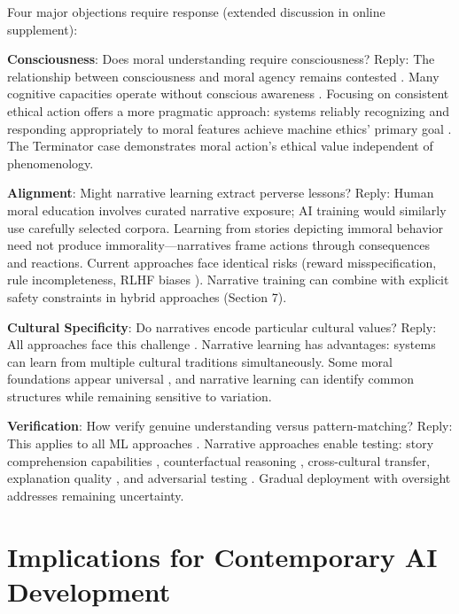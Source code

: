 \documentclass[12pt]{article}
\begin{document}
Four major objections require response (extended discussion in online supplement):

\textbf{Consciousness}: Does moral understanding require consciousness? Reply: The relationship between consciousness and moral agency remains contested \citep{levy2014consciousness, shepherd2018consciousness}. Many cognitive capacities operate without conscious awareness \citep{carruthers2015conscious}. Focusing on consistent ethical action offers a more pragmatic approach: systems reliably recognizing and responding appropriately to moral features achieve machine ethics' primary goal \citep{bryson2018patiency}. The Terminator case demonstrates moral action's ethical value independent of phenomenology.

\textbf{Alignment}: Might narrative learning extract perverse lessons? Reply: Human moral education involves curated narrative exposure; AI training would similarly use carefully selected corpora. Learning from stories depicting immoral behavior need not produce immorality---narratives frame actions through consequences and reactions. Current approaches face identical risks (reward misspecification, rule incompleteness, RLHF biases \citep{casper2023open}). Narrative training can combine with explicit safety constraints in hybrid approaches (Section 7).

\textbf{Cultural Specificity}: Do narratives encode particular cultural values? Reply: All approaches face this challenge \citep{beauchamp2001principles}. Narrative learning has advantages: systems can learn from multiple cultural traditions simultaneously. Some moral foundations appear universal \citep{brown1991human, haidt2012righteous}, and narrative learning can identify common structures while remaining sensitive to variation.

\textbf{Verification}: How verify genuine understanding versus pattern-matching? Reply: This applies to all ML approaches \citep{hendrycks2021unsolved}. Narrative approaches enable testing: story comprehension capabilities \citep{forbes2020social, sap2019socialiqa}, counterfactual reasoning \citep{pearl2009causality}, cross-cultural transfer, explanation quality \citep{mittelstadt2019explaining}, and adversarial testing \citep{kenton2021alignment}. Gradual deployment with oversight addresses remaining uncertainty.

\section{Implications for Contemporary AI Development}
\end{document}
